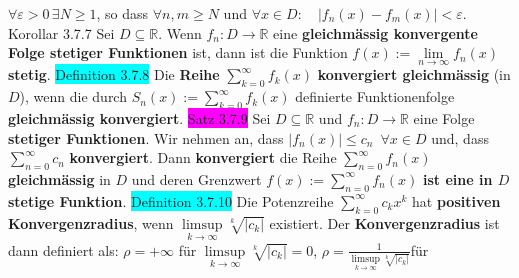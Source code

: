 \documentclass[landscape, 10pt]{article}
\newcommand{\R}{\mathbb{R}}
\begin{document}
\begin{multicols}{3}
                     \textcolor{NavyBlue}{$\forall\varepsilon>0\,\exists N\geqslant1$}, 
                     so dass 
                     \textcolor{NavyBlue}{$\forall n,m\geqslant N$} und 
                     \textcolor{NavyBlue}{$\forall x\in D:\quad |f_n(x)-f_m(x)|<\varepsilon$}.
              \colorbox{BurntOrange}{Korollar 3.7.7} Sei \textcolor{NavyBlue}{$D\subseteq\R$}. Wenn 
                     \textcolor{NavyBlue}{$f_n:D\longrightarrow\R$} 
                     eine \textbf{gleichmässig konvergente Folge stetiger Funktionen} ist, 
                     dann ist die Funktion \textcolor{NavyBlue}{
                     $f(x):=\lim\limits_{n\to\infty}f_n(x)$} \textbf{stetig}.
              \colorbox{cyan}{Definition 3.7.8} Die \textbf{Reihe}
                     \textcolor{NavyBlue}{$\sum_{k=0}^\infty f_k(x)$}
                     \textbf{konvergiert gleichmässig} (in $D$), wenn die durch 
                     \textcolor{NavyBlue}{$S_n(x):=\sum_{k=0}^\infty f_k(x)$} 
                     definierte Funktionenfolge \textbf{gleichmässig konvergiert}.
              \colorbox{magenta}{Satz 3.7.9} Sei \textcolor{NavyBlue}{$D\subseteq\R$} und 
                     \textcolor{NavyBlue}{$f_n:D\longrightarrow\R$} 
                     eine Folge \textbf{stetiger Funktionen}. 
                     Wir nehmen an, dass 
                     \textcolor{NavyBlue}{$|f_n(x)|\leqslant c_n\enspace\forall x\in D$}
                     und, dass \textcolor{NavyBlue}{$\sum_{n=0}^\infty c_n$} \textbf{konvergiert}. 
                     Dann \textbf{konvergiert} die Reihe 
                     \textcolor{NavyBlue}{$\sum_{n=0}^\infty f_n(x)$} \textbf{gleichmässig} 
                     in $D$ und deren 
                     Grenzwert \textcolor{NavyBlue}{$f(x):=\sum_{n=0}^\infty f_n(x)$} 
                     \textbf{ist eine in $D$ stetige Funktion}.
              \colorbox{cyan}{Definition 3.7.10} Die Potenzreihe 
                     \textcolor{NavyBlue}{$\sum_{k=0}^\infty c_kx^k$}
                     hat \textbf{positiven Konvergenzradius}, wenn 
                     \textcolor{NavyBlue}{$\limsup\limits_{k\to\infty}\sqrt[k]{|c_k|}$} 
                     existiert. 
                     Der \textbf{Konvergenzradius} ist dann definiert als: 
                     \textcolor{NavyBlue}{$\rho=+\infty$} \qquad\qquad für
                     \textcolor{NavyBlue}{$\limsup\limits_{k\to\infty}\sqrt[k]{|c_k|}=0$},
                     \qquad\qquad\qquad\qquad\qquad\qquad\qquad\qquad\enspace\enspace
                     \textcolor{NavyBlue}{
                     $\rho=\frac{1}{\limsup\limits_{k\to\infty}\sqrt[k]{|c_k|}}$}\quad für

\end{multicols}
\end{document}
